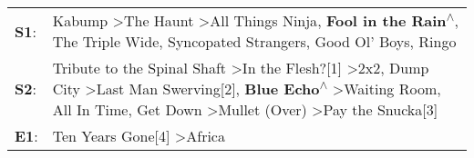 \begin{supertabular}{p{0.03\textwidth}p{0.92\textwidth}}
 \textbf{S1}:  &                                                                                                                                                                                      Kabump\textsuperscript{} \textgreater \enspace The Haunt\textsuperscript{} \textgreater \enspace All Things Ninja\textsuperscript{}, \enspace \textbf{Fool in the Rain\textsuperscript{$\wedge$}}, \enspace The Triple Wide\textsuperscript{}, \enspace Syncopated Strangers\textsuperscript{}, \enspace Good Ol' Boys\textsuperscript{}, \enspace Ringo\textsuperscript{}  \enspace  \\
 \textbf{S2}:  &  Tribute to the Spinal Shaft\textsuperscript{} \textgreater \enspace In the Flesh?[1]\textsuperscript{} \textgreater \enspace 2x2\textsuperscript{}, \enspace Dump City\textsuperscript{} \textgreater \enspace Last Man Swerving[2]\textsuperscript{}, \enspace \textbf{Blue Echo\textsuperscript{$\wedge$}} \textgreater \enspace Waiting Room\textsuperscript{}, \enspace All In Time\textsuperscript{}, \enspace Get Down\textsuperscript{} \textgreater \enspace Mullet (Over)\textsuperscript{} \textgreater \enspace Pay the Snucka[3]\textsuperscript{}  \enspace  \\
 \textbf{E1}:  &                                                                                                                                                                                                                                                                                                                                                                                                                                                                              Ten Years Gone[4]\textsuperscript{} \textgreater \enspace Africa\textsuperscript{}  \enspace  \\
\end{supertabular}
